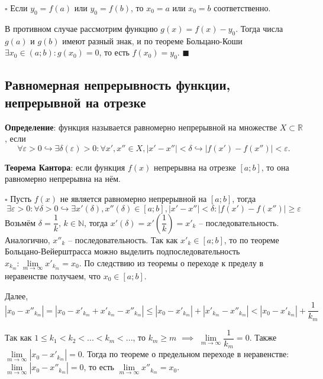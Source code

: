 \documentclass[12pt, a4paper, reqno]{article}
\begin{document}
    $\square$ Если $y_0 = f(a)$ или $y_0 = f(b)$, то $x_0 = a$ или $x_0 = b$ соответственно.

    В противном случае рассмотрим функцию $g(x) = f(x) - y_0$. Тогда числа $g(a)$ и $g(b)$ имеют
    разный знак, и по теореме Больцано-Коши $\exists x_0\in(a; b): g(x_0) = 0$, то есть $f(x_0) =
    y_0$. $\blacksquare$

\subsection{Равномерная непрерывность функции, непрерывной на отрезке}

    \textbf{Определение}: функция называется равномерно непрерывной на множестве
    $X\subset\mathbb{R}$, если
    \begin{equation*}
        \forall\varepsilon > 0\hookrightarrow \exists\delta(\varepsilon) > 0: \forall x', x''\in X,
        |x' - x''| < \delta \hookrightarrow |f(x') - f(x'')| < \varepsilon.
    \end{equation*}

    \textbf{Теорема Кантора}: если функция $f(x)$ непрерывна на отрезке $[a; b]$, то она равномерно
    непрерывна на нём.

    $\square$ Пусть $f(x)$ не является равномерно непрерывной на $[a; b]$, тогда
    \begin{equation*}
        \exists\varepsilon > 0: \forall\delta > 0 \hookrightarrow \exists x'(\delta), x''(\delta)
        \in[a; b], |x' - x''| < \delta: |f(x') - f(x'')| \geq \varepsilon
    \end{equation*}
    Возьмём $\delta = \dfrac{1}{k}$, $k\in\mathbb{N}$, тогда $x'(\delta) =
    x'\left(\dfrac{1}{k}\right) = x'_k$ -- последовательность. Аналогично, $x''_k$ --
    последовательность. Так как $x'_k\in[a; b]$, то по теореме Больцано-Вейерштрасса можно выделить
    подпоследовательность $x_{k_m}: \lim\limits_{m\to\infty} x'_{k_m} = x_0$. По следствию из
    теоремы о переходе к пределу в неравенстве получаем, что $x_0\in[a; b]$.

    Далее,
    \begin{equation*}
        |x_0 - x''_{k_m}| = |x_0 - x'_{k_m} + x'_{k_m} - x''_{k_m}| \leq |x_0 - x'_{k_m}| +
        |x'_{k_m} - x''_{k_m}| < |x_0 - x'_{k_m}| + \dfrac{1}{k_m}
    \end{equation*}

    Так как $1\leq k_1 < k_2 < ... < k_m < ...$, то $k_m \geq m$ $\implies$ $\lim\limits_{m\to\infty}
    \dfrac{1}{k_m} = 0$. Также $\lim\limits_{m\to\infty} |x_0 - x'_{k_m}| = 0$. Тогда по теореме о
    предельном переходе в неравенстве: $\lim\limits_{m\to\infty} |x_0 - x''_{k_m}| = 0$, то есть
    $\lim\limits_{m\to\infty} x''_{k_m} = x_0$.
\end{document}

